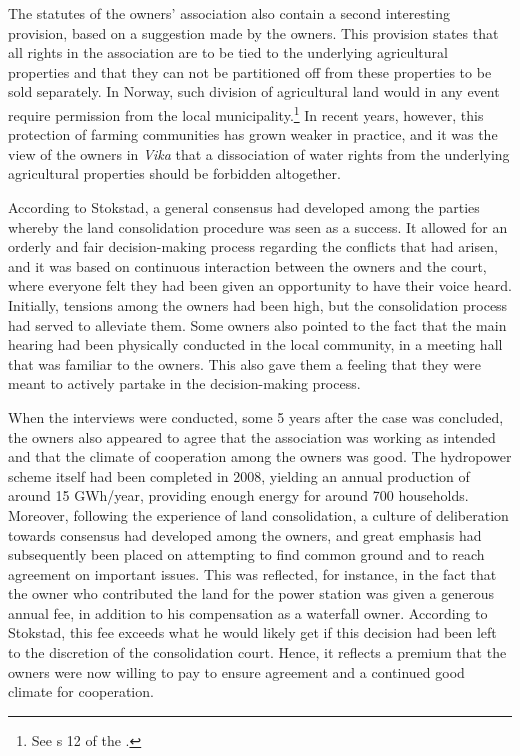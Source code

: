 The statutes of the owners' association also contain a second interesting provision, based on a suggestion made by the owners. This provision states that all rights in the association are to be tied to the underlying agricultural properties and that they can not be partitioned off from these properties to be sold separately. In Norway, such division of agricultural land would in any event require permission from the local municipality.\footnote{See s 12 of the \cite{la95}.} In recent years, however, this protection of farming communities has grown weaker in practice, and it was the view of the owners in \emph{Vika} that a dissociation of water rights from the underlying agricultural properties should be forbidden altogether.

According to Stokstad, a general consensus had developed among the parties whereby the land consolidation procedure was seen as a success. It allowed for an orderly and fair decision-making process regarding the conflicts that had arisen, and it was based on continuous interaction between the owners and the court, where everyone felt they had been given an opportunity to have their voice heard. Initially, tensions among the owners had been high, but the consolidation process had served to alleviate them. Some owners also pointed to the fact that the main hearing had been physically conducted in the local community, in a meeting hall that was familiar to the owners. This also gave them a feeling that they were meant to actively partake in the decision-making process. 

When the interviews were conducted, some 5 years after the case was concluded, the owners also appeared to agree that the association was working as intended and that the climate of cooperation among the owners was good. The hydropower scheme itself had been completed in 2008, yielding an annual production of around 15 GWh/year, providing enough energy for around 700 households. Moreover, following the experience of land consolidation, a culture of deliberation towards consensus had developed among the owners, and great emphasis had subsequently been placed on attempting to find common ground and to reach agreement on important issues. This was reflected, for instance, in the fact that the owner who contributed the land for the power station was given a generous annual fee, in addition to his compensation as a waterfall owner. According to Stokstad, this fee exceeds what he would likely get if this decision had been left to the discretion of the consolidation court. Hence, it reflects a premium that the owners were now willing to pay to ensure agreement and a continued good climate for cooperation.

